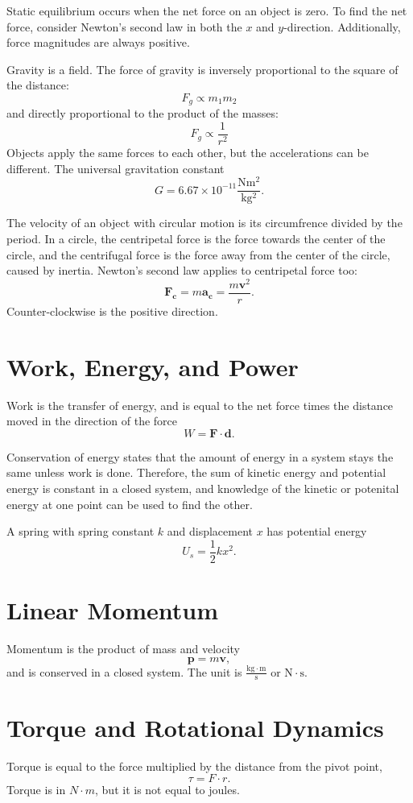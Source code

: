 \documentclass{article}
\begin{document}
Static equilibrium occurs when the net force on an object is zero.
To find the net force, consider Newton's second law in both the $x$ and $y$-direction. 
Additionally, force magnitudes are always positive. 

Gravity is a field. The force of gravity is inversely proportional to the square of the distance:
\[
F_g \propto m_1m_2 
\]
and directly proportional to the product of the masses:
\[
F_g \propto \frac{1}{r^2}
\]
Objects apply the same forces to each other, but the accelerations can be different.
The universal gravitation constant 
\[
G = 6.67 \times 10^{-11} \frac{\mathrm{Nm^2}}{\mathrm{kg^2}}.
\] 

The velocity of an object with circular motion is its circumfrence divided by the period.
In a circle, the centripetal force is the force towards the center of the circle,
and the centrifugal force is the force away from the center of the circle, caused by inertia.
Newton's second law applies to centripetal force too:
\[
\mathbf{F_c} = m\mathbf{a_c} = \frac{m\mathbf{v}^2}{r}.
\]
Counter-clockwise is the positive direction. 

\section*{Work, Energy, and Power}

Work is the transfer of energy, and is equal to the net force times the distance moved in the direction of the force
\[
W = \mathbf{F \cdot d}. 
\]

Conservation of energy states that the amount of energy in a system stays the same unless work is done. 
Therefore, the sum of kinetic energy and potential energy is constant in a closed system,
and knowledge of the kinetic or potenital energy at one point can be used to find the other.

A spring with spring constant $k$ and displacement $x$ has potential energy
\[
U_s = \frac{1}{2}kx^2.
\]  

\section*{Linear Momentum}

Momentum is the product of mass and velocity
\[
\mathbf{p} = m\mathbf{v},
\]
and is conserved in a closed system. The unit is $\frac{\mathrm{kg \cdot m}}{\mathrm{s}}$ or $\mathrm{N \cdot s}$.

\section*{Torque and Rotational Dynamics}

Torque is equal to the force multiplied by the distance from the pivot point, 
\[
\tau = F \cdot r.
\]
Torque is in $N\cdot m $, but it is not equal to joules. 
\end{document}
